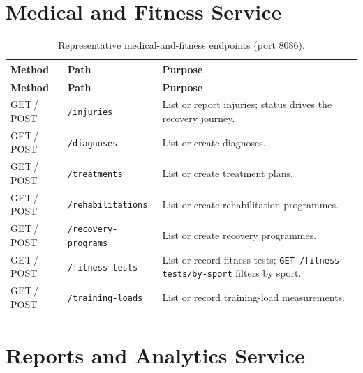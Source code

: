 \section{Medical and Fitness Service}
\label{app:api-medical}

\begin{longtable}{p{} p{} p{}}
\caption{Representative medical-and-fitness endpoints (port 8086).}
\label{tab:api-medical}\\
\toprule
\textbf{Method} & \textbf{Path} & \textbf{Purpose} \\
\midrule
\endfirsthead
\toprule
\textbf{Method} & \textbf{Path} & \textbf{Purpose} \\
\midrule
\endhead
\bottomrule
\endlastfoot
GET\,/\,POST & \texttt{/injuries} & List or report injuries; status drives the recovery journey. \\
GET\,/\,POST & \texttt{/diagnoses} & List or create diagnoses. \\
GET\,/\,POST & \texttt{/treatments} & List or create treatment plans. \\
GET\,/\,POST & \texttt{/rehabilitations} & List or create rehabilitation programmes. \\
GET\,/\,POST & \texttt{/recovery-programs} & List or create recovery programmes. \\
GET\,/\,POST & \texttt{/fitness-tests} & List or record fitness tests; \texttt{GET /fitness-tests/by-sport} filters by sport. \\
GET\,/\,POST & \texttt{/training-loads} & List or record training-load measurements. \\
\end{longtable}

\section{Reports and Analytics Service}
\label{app:api-reports}

